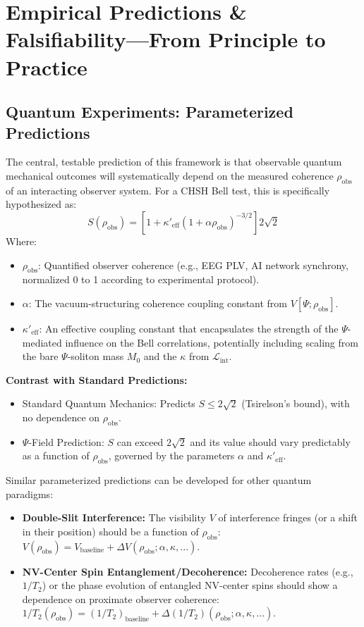 \documentclass[11pt, a4paper]{book}
\begin{document}
\section{Empirical Predictions \& Falsifiability—From Principle to Practice}
\label{sec:empiricalpredictions}

\subsection{Quantum Experiments: Parameterized Predictions}
\label{ssec:empiricalpredictions_quantumexp}
The central, testable prediction of this framework is that observable quantum mechanical outcomes will systematically depend on the measured coherence $\rho_{\text{obs}}$ of an interacting observer system. For a CHSH Bell test, this is specifically hypothesized as:
\[ S(\rho_{\text{obs}}) = \left[1 + \kappa'_{\text{eff}}(1 + \alpha \rho_{\text{obs}})^{-3/2}\right] 2\sqrt{2} \]
Where:
\begin{itemize}
    \item $\rho_{\text{obs}}$: Quantified observer coherence (e.g., EEG PLV, AI network synchrony, normalized 0 to 1 according to experimental protocol).
    \item $\alpha$: The vacuum-structuring coherence coupling constant from $V[\Psi; \rho_{\text{obs}}]$.
    \item $\kappa'_{\text{eff}}$: An effective coupling constant that encapsulates the strength of the $\Psi$-mediated influence on the Bell correlations, potentially including scaling from the bare $\Psi$-soliton mass $M_0$ and the $\kappa$ from $\mathcal{L}_{\text{int}}$.
\end{itemize}
\textbf{Contrast with Standard Predictions:}
\begin{itemize}
    \item Standard Quantum Mechanics: Predicts $S \leq 2\sqrt{2}$ (Tsirelson's bound), with no dependence on $\rho_{\text{obs}}$.
    \item $\Psi$-Field Prediction: $S$ can exceed $2\sqrt{2}$ and its value should vary predictably as a function of $\rho_{\text{obs}}$, governed by the parameters $\alpha$ and $\kappa'_{\text{eff}}$.
\end{itemize}
Similar parameterized predictions can be developed for other quantum paradigms:
\begin{itemize}
    \item \textbf{Double-Slit Interference:} The visibility $V$ of interference fringes (or a shift in their position) should be a function of $\rho_{\text{obs}}$: $V(\rho_{\text{obs}}) = V_{\text{baseline}} + \Delta V(\rho_{\text{obs}}; \alpha, \kappa, ...)$.
    \item \textbf{NV-Center Spin Entanglement/Decoherence:} Decoherence rates (e.g., $1/T_2$) or the phase evolution of entangled NV-center spins should show a dependence on proximate observer coherence: $1/T_2(\rho_{\text{obs}}) = (1/T_2)_{\text{baseline}} + \Delta (1/T_2)(\rho_{\text{obs}}; \alpha, \kappa, ...)$.
\end{itemize}
\end{document}

